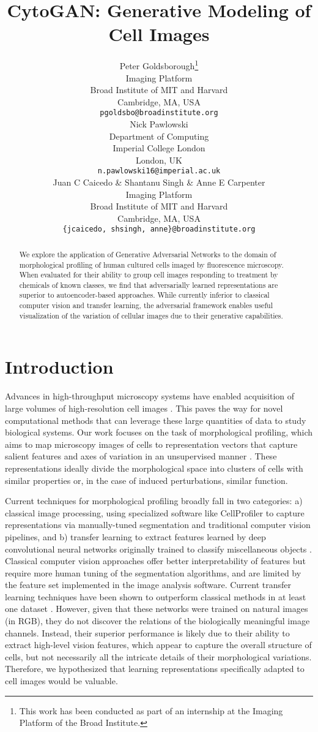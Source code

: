 \documentclass{article}
\title{CytoGAN: Generative Modeling of Cell Images}
\author{
  Peter Goldsborough\thanks{This work has been conducted as part of an internship at the Imaging Platform of the Broad Institute.}\\
  Imaging Platform \\
  Broad Institute of MIT and Harvard \\
  Cambridge, MA, USA \\
  \texttt{pgoldsbo@broadinstitute.org} \\
  \And
  Nick Pawlowski \\
  Department of Computing \\
  Imperial College London \\
  London, UK \\
  \texttt{n.pawlowski16@imperial.ac.uk} \\
  \AND
  Juan C Caicedo \& Shantanu Singh \& Anne E Carpenter\\
  Imaging Platform \\
  Broad Institute of MIT and Harvard \\
  Cambridge, MA, USA \\
  \texttt{\{jcaicedo, shsingh, anne\}@broadinstitute.org} \\
}
\begin{document}
\maketitle

\begin{abstract}
We explore the application of Generative Adversarial Networks to the domain of morphological profiling of human cultured cells imaged by fluorescence microscopy. When evaluated for their ability to group cell images responding to treatment by chemicals of known classes, we find that adversarially learned representations are superior to autoencoder-based approaches. While currently inferior to classical computer vision and transfer learning, the adversarial framework enables useful visualization of the variation of cellular images due to their generative capabilities.
\end{abstract}

\section{Introduction}
Advances in high-throughput microscopy systems have enabled acquisition of large volumes of high-resolution cell images \cite{caicedo2017data}. This paves the way for novel computational methods that can leverage these large quantities of data to study biological systems. Our work focuses on the task of morphological profiling, which aims to map microscopy images of cells to representation vectors that capture salient features and axes of variation in an unsupervised manner \cite{caicedo_profiling}. These representations ideally divide the morphological space into clusters of cells with similar properties or, in the case of induced perturbations, similar function.

Current techniques for morphological profiling broadly fall in two categories: a) classical image processing, using specialized software like CellProfiler \cite{Carpenter2006} to capture representations via manually-tuned segmentation and traditional computer vision pipelines, and b) transfer learning to extract features learned by deep convolutional neural networks originally trained to classify miscellaneous objects \cite{pawlowski2016automating, ando2017improving}. Classical computer vision approaches offer better interpretability of features but require more human tuning of the segmentation algorithms, and are limited by the feature set implemented in the image analysis software. Current transfer learning techniques have been shown to outperform classical methods in at least one dataset \cite{pawlowski2016automating,ando2017improving}. However, given that these networks were trained on natural images (in RGB), they do not discover the relations of the biologically meaningful image channels. Instead, their superior performance is likely due to their ability to extract high-level vision features, which appear to capture the overall structure of cells, but not necessarily all the intricate details of their morphological variations. Therefore, we hypothesized that learning representations specifically adapted to cell images would be valuable.
\end{document}
